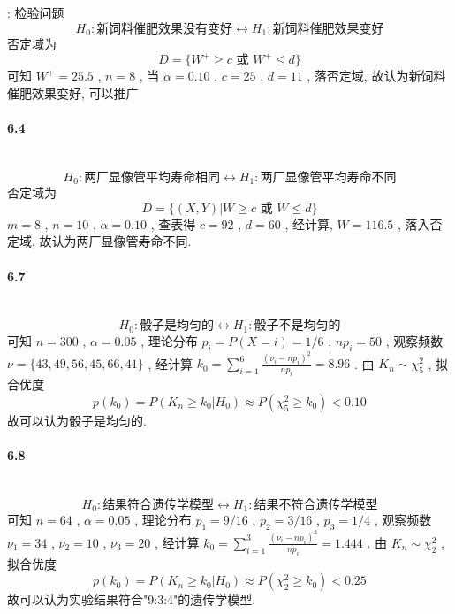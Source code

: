 \documentclass[UTF8]{ctexart}
\begin{document}
        : 检验问题
        \[H_0 : \text{新饲料催肥效果没有变好} \leftrightarrow H_1 : \text{新饲料催肥效果变好}\]
        否定域为
        \[D=\{W^+ \ge c \text{ 或 } W^+ \le d\}\]
        可知 $W^+ = 25.5$ , $n = 8$ , 当 $\alpha = 0.10$ , $c = 25$ , $d = 11$ ,
        落否定域, 故认为新饲料催肥效果变好, 可以推广\\
    
    \paragraph{6.4}\quad\\
         \[H_0 : \text{两厂显像管平均寿命相同} \leftrightarrow H_1 : \text{两厂显像管平均寿命不同}\]
         否定域为
        \[D=\{(X,Y)|W \ge c \text{ 或 } W \le d\}\]
        $m = 8$ , $n = 10$ , $\alpha = 0.10$ , 查表得 $c = 92$ , $d = 60$ , 经计算, $W = 116.5$ , 落入否定域, 故认为两厂显像管寿命不同.\\
    
    \paragraph{6.7}\quad\\
        \[H_0 : \text{骰子是均匀的} \leftrightarrow H_1 : \text{骰子不是均匀的}\]
        可知 $n = 300$ , $\alpha = 0.05$ , 理论分布 $p_i = P(X = i) = 1/6$ , $n p_i = 50$ , 观察频数 $\nu = \{43, 49, 56, 45, 66, 41\}$ , 经计算 $k_0 = \sum^{6}_{i = 1}\frac{(\nu_i - n p_i)^2}{n p_i} = 8.96$ .
        由 $K_n \sim \chi^2_5$ , 拟合优度 
        \[p(k_0) = P(K_n \ge k_0 | H_0) \approx P(\chi^2_5 \ge k_0) < 0.10 \]
        故可以认为骰子是均匀的.\\
    
    \paragraph{6.8}\quad\\
        \[H_0 : \text{结果符合遗传学模型} \leftrightarrow H_1 : \text{结果不符合遗传学模型}\]
        可知 $n = 64$ , $\alpha = 0.05$ , 理论分布 $p_1 = 9/16$ , $p_2 = 3/16$ , $p_3 = 1/4$ , 观察频数 $\nu_1 = 34$ , $\nu_2 = 10$ , $\nu_3 = 20$ , 经计算 $k_0 = \sum^{3}_{i = 1}\frac{(\nu_i - n p_i)^2}{n p_i} = 1.444$ .
        由 $K_n \sim \chi^2_2$ , 拟合优度 
        \[p(k_0) = P(K_n \ge k_0 | H_0) \approx P(\chi^2_2 \ge k_0) < 0.25 \]
        故可以认为实验结果符合"9:3:4"的遗传学模型.\\

    
\end{document}
